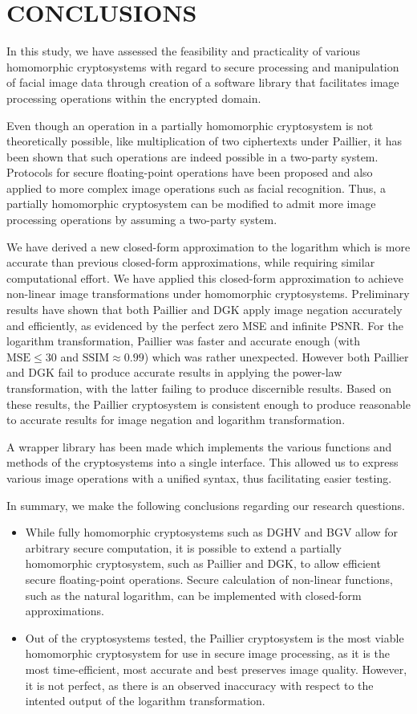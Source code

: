\chapter{CONCLUSIONS}
In this study, we have assessed the feasibility and practicality of various homomorphic cryptosystems with regard to secure processing and manipulation of facial image data through creation of a software library that facilitates image processing operations within the encrypted domain.

Even though an operation in a partially homomorphic cryptosystem is not theoretically possible, like multiplication of two ciphertexts under Paillier, it has been shown that such operations are indeed possible in a two-party system. Protocols for secure floating-point operations have been proposed and also applied to more complex image operations such as facial recognition.  Thus, a partially homomorphic cryptosystem can be modified to admit more image processing operations by assuming a two-party system.

We have derived a new closed-form approximation to the logarithm which is more accurate than previous closed-form approximations, while requiring similar computational effort. We have applied this closed-form approximation to achieve non-linear image transformations under homomorphic cryptosystems. Preliminary results have shown that both Paillier and DGK apply image negation accurately and efficiently, as evidenced by the perfect zero MSE and infinite PSNR. For the logarithm transformation, Paillier was faster and accurate enough (with $\text{MSE} \le 30$ and $\text{SSIM} \approx 0.99$) which was rather unexpected. However both Paillier and DGK fail to produce accurate results in applying the power-law transformation, with the latter failing to produce discernible results. Based on these results, the Paillier cryptosystem is consistent enough to produce reasonable to accurate results for image negation and logarithm transformation.

A wrapper library has been made which implements the various functions and methods of the cryptosystems into a single interface. This allowed us to express various image operations with a unified syntax, thus facilitating easier testing.

In summary, we make the following conclusions regarding our research questions.
\begin{itemize}
    \item While fully homomorphic cryptosystems such as DGHV and BGV allow for arbitrary secure computation, it is possible to extend a partially homomorphic cryptosystem, such as Paillier and DGK, to allow efficient secure floating-point operations. Secure calculation of non-linear functions, such as the natural logarithm, can be implemented with closed-form approximations.
    \item Out of the cryptosystems tested, the Paillier cryptosystem is the most viable homomorphic cryptosystem for use in secure image processing, as it is the most time-efficient, most accurate and best preserves image quality. However, it is not perfect, as there is an observed inaccuracy with respect to the intented output of the logarithm transformation.
\end{itemize}


